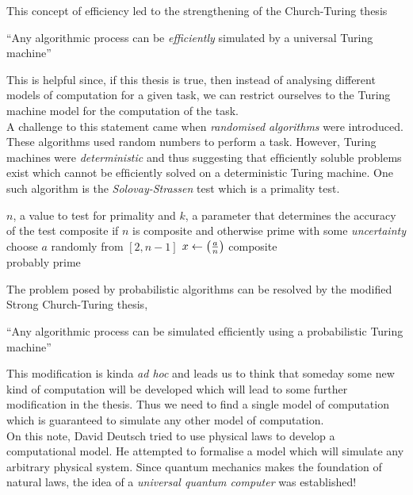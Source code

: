 This concept of efficiency led to the strengthening of the Church-Turing thesis
\begin{center}
    ``Any algorithmic process can be \textit{efficiently} simulated by a universal Turing machine''
\end{center}
This is helpful since, if this thesis is true, then instead of analysing different models of computation for a given task, we can restrict ourselves to the Turing machine model for the computation of the task. \\[0.2cm]
A challenge to this statement came when \textit{randomised algorithms} were introduced. These algorithms used random numbers to perform a task. However, Turing machines were \textit{deterministic} and thus suggesting that efﬁciently soluble problems exist which cannot be efﬁciently solved on a deterministic Turing machine. One such algorithm is the \textit{Solovay-Strassen} test which is a primality test. 
\begin{algorithm}\hspace*{0.1cm}
\begin{algorithmic}[1]
\Require $n$, a value to test for primality and $k$, a parameter that determines the accuracy of the test 
\Ensure composite if $n$ is composite and otherwise prime with some \textit{uncertainty}
    \State choose $a$ randomly from $[2,n-1]$
    \State $x \gets \qty(\frac{a}{n})$ 
    \State \Return composite 
    \EndIf
    \EndFor\\
\Return probably prime
\end{algorithmic}
\end{algorithm}
The problem posed by probabilistic algorithms can be resolved by the modified Strong Church-Turing thesis,
\begin{center}
    ``Any algorithmic process can be simulated efﬁciently using a
probabilistic Turing machine''
\end{center}
This modification is kinda \textit{ad hoc} and leads us to think that someday some new kind of computation will be developed which will lead to some further modification in the thesis. Thus we need to find a  single model of computation which is guaranteed to simulate any other model of computation.\\[0.2cm]
On this note, David Deutsch tried to use physical laws to develop a computational model. He attempted to formalise a model which will simulate any arbitrary physical system. Since quantum mechanics makes the foundation of natural laws, the idea of a \textit{universal quantum computer} was established!\\[0.2cm]
